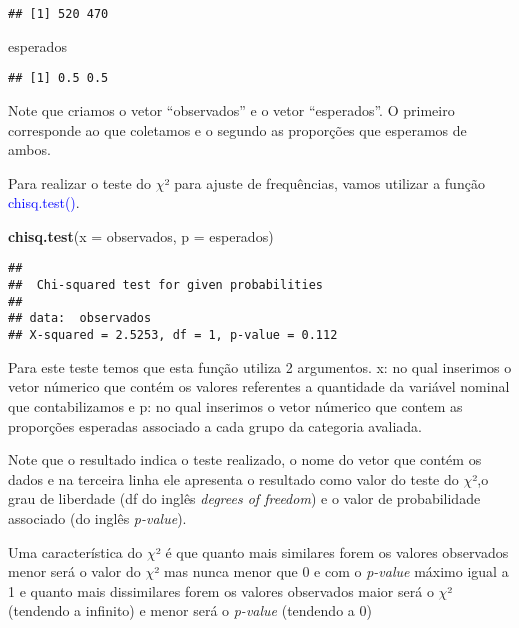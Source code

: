 \documentclass[titlepage, oneside, openany, a4paper]{book}
\newenvironment{Shaded}{\begin{snugshade}}{\end{snugshade}}
\newcommand{\DataTypeTok}[1]{\textcolor[rgb]{0.13,0.29,0.53}{#1}}
\newcommand{\KeywordTok}[1]{\textcolor[rgb]{0.13,0.29,0.53}{\textbf{#1}}}
\newcommand{\NormalTok}[1]{#1}
\begin{document}
\begin{verbatim}
## [1] 520 470
\end{verbatim}

\begin{Shaded}
\begin{Highlighting}[]
\NormalTok{esperados}
\end{Highlighting}
\end{Shaded}

\begin{verbatim}
## [1] 0.5 0.5
\end{verbatim}

Note que criamos o vetor ``observados'' e o vetor ``esperados''. O primeiro corresponde ao que coletamos e o segundo as proporções que esperamos de ambos.

Para realizar o teste do \(\chi\)² para ajuste de frequências, vamos utilizar a função \textcolor{blue}{chisq.test()}.

\begin{Shaded}
\begin{Highlighting}[]
\KeywordTok{chisq.test}\NormalTok{(}\DataTypeTok{x =}\NormalTok{ observados, }\DataTypeTok{p =}\NormalTok{ esperados)}
\end{Highlighting}
\end{Shaded}

\begin{verbatim}
## 
##  Chi-squared test for given probabilities
## 
## data:  observados
## X-squared = 2.5253, df = 1, p-value = 0.112
\end{verbatim}

Para este teste temos que esta função utiliza 2 argumentos. x: no qual inserimos o vetor númerico que contém os valores referentes a quantidade da variável nominal que contabilizamos e p: no qual inserimos o vetor númerico que contem as proporções esperadas associado a cada grupo da categoria avaliada.

Note que o resultado indica o teste realizado, o nome do vetor que contém os dados e na terceira linha ele apresenta o resultado como valor do teste do \(\chi\)²,o grau de liberdade (df do inglês \emph{degrees of freedom}) e o valor de probabilidade associado (do inglês \emph{p-value}).

Uma característica do \(\chi\)² é que quanto mais similares forem os valores observados menor será o valor do \(\chi\)² mas nunca menor que 0 e com o \emph{p-value} máximo igual a 1 e quanto mais dissimilares forem os valores observados maior será o \(\chi\)² (tendendo a infinito) e menor será o \emph{p-value} (tendendo a 0)
\end{document}
